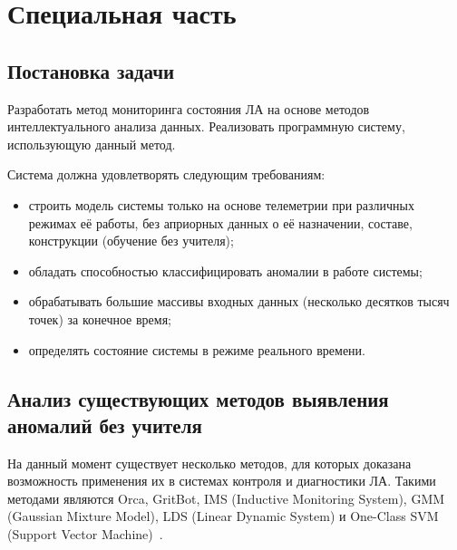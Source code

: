 \chapter{Специальная часть}
\section{Постановка задачи}
Разработать метод мониторинга состояния ЛА на основе методов интеллектуального анализа данных. Реализовать программную систему, использующую данный метод.

Система должна удовлетворять следующим требованиям:
\begin{itemize}
	\item строить модель системы только на основе телеметрии при различных режимах её работы, без априорных данных о её назначении, составе, конструкции (обучение без учителя);
	\item обладать способностью классифицировать аномалии в работе системы;
	\item обрабатывать большие массивы входных данных (несколько десятков тысяч точек) за конечное время;
	\item определять состояние системы в режиме реального времени.
\end{itemize}

\section{Анализ существующих методов выявления аномалий без учителя}
На данный момент существует несколько методов, для которых доказана возможность применения их в системах контроля и диагностики ЛА. Такими методами являются Orca, GritBot, IMS (Inductive Monitoring System), GMM (Gaussian Mixture Model), LDS (Linear Dynamic System) и One-Class SVM (Support Vector Machine)~\cite{MartinCompUnsupervisedDetectionMethods}.



